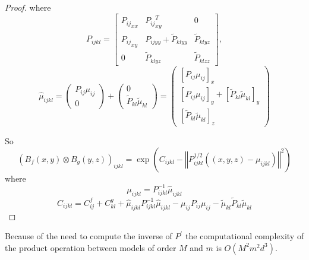 \begin{proof}
    where
    \begin{equation}
    P_{ijkl} = \left[\begin{array}{ ccc }
    {P_{ij}}_{xx} & {P_{ij}}_{xy}^T & 0 \\
    {P_{ij}}_{xy} &P_{ijyy} + \tilde P_{klyy}  & \tilde P_{klyz} \\
    0 & \tilde P_{klyz} & \tilde P_{klzz}
    \end{array}\right],
\end{equation}
    \begin{equation}
    \hat\mu_{ijkl} = \begin{pmatrix}
    {P_{ij}}\mu_{ij}\\
    0\end{pmatrix} +
    \begin{pmatrix}
     0 \\
    {\tilde P_{kl}}\tilde\mu_{kl}
    \end{pmatrix} =
    \begin{pmatrix}
    [{P_{ij}}\mu_{ij}]_x\\
    [{P_{ij}}\mu_{ij}]_{y} + [{\tilde P_{kl}}\tilde\mu_{kl}]_{y}\\
    [{\tilde P_{kl}}\tilde\mu_{kl}]_{z}
     \end{pmatrix}
\end{equation}

So
\begin{equation}
    (B_f(x, y) \otimes B_g(y, z))_{ijkl} =  \exp\left(C_{ijkl}-\left\Vert P_{ijkl}^{1/2}\left((x, y, z) - \mu_{ijkl}\right)\right\Vert^2\right)
\end{equation}
where
\begin{equation}
    \mu_{ijkl} = P_{ijkl}^{-1}\hat\mu_{ijkl}
\end{equation}
\begin{equation}
    C_{ijkl} = C^f_{ij} + C^g_{kl} +\hat\mu_{ijkl}P_{ijkl}^{-1}\hat\mu_{ijkl} -  \mu_{ij}P_{ij}\mu_{ij} - \tilde\mu_{kl}\tilde P_{kl}\tilde\mu_{kl}
\end{equation}
\end{proof}
\begin{remark}
Because of the need to compute the inverse of $P^\prime$ the computational complexity of the product operation between models of order $M$ and $m$ is $O(M^2m^2d^3)$.
\end{remark}
